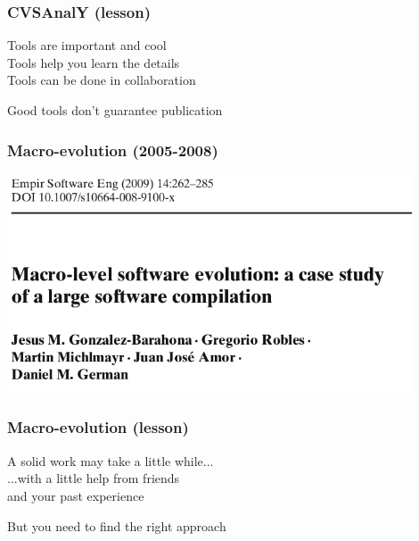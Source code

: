 \documentclass[17pt,aspectratio=169,hyperref=pdfusetitle]{beamer}
\begin{document}
\begin{frame}[fragile]
  \frametitle{CVSAnalY (lesson)}

  Tools are important and cool \\
  Tools help you learn the details \\
  Tools can be done in collaboration \\
  
  \begin{center}
      Good tools don't guarantee publication
  \end{center}  
  
\end{frame}


\begin{frame}[fragile]
  \frametitle{Macro-evolution (2005-2008)}

  \begin{center}
  \includegraphics[width=12cm]{figs/macro-evolution}
  \end{center}  
  
\end{frame}

\begin{frame}[fragile]
  \frametitle{Macro-evolution (lesson)}

  A solid work may take a little while... \\
  ...with a little help from friends \\
  and your past experience \\
  
  \begin{center}
    But you need to find the right approach
  \end{center}  
  
\end{frame}
\end{document}
